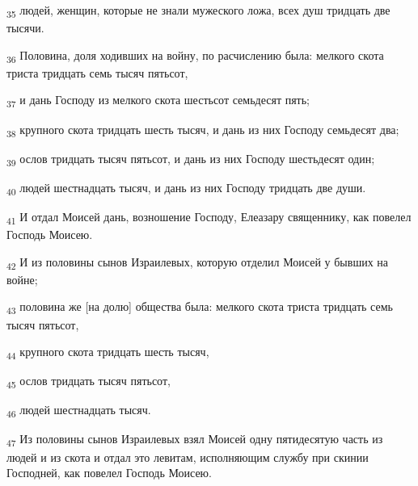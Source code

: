 \begin{tcolorbox}
\textsubscript{35} людей, женщин, которые не знали мужеского ложа, всех душ тридцать две тысячи.
\end{tcolorbox}
\begin{tcolorbox}
\textsubscript{36} Половина, доля ходивших на войну, по расчислению была: мелкого скота триста тридцать семь тысяч пятьсот,
\end{tcolorbox}
\begin{tcolorbox}
\textsubscript{37} и дань Господу из мелкого скота шестьсот семьдесят пять;
\end{tcolorbox}
\begin{tcolorbox}
\textsubscript{38} крупного скота тридцать шесть тысяч, и дань из них Господу семьдесят два;
\end{tcolorbox}
\begin{tcolorbox}
\textsubscript{39} ослов тридцать тысяч пятьсот, и дань из них Господу шестьдесят один;
\end{tcolorbox}
\begin{tcolorbox}
\textsubscript{40} людей шестнадцать тысяч, и дань из них Господу тридцать две души.
\end{tcolorbox}
\begin{tcolorbox}
\textsubscript{41} И отдал Моисей дань, возношение Господу, Елеазару священнику, как повелел Господь Моисею.
\end{tcolorbox}
\begin{tcolorbox}
\textsubscript{42} И из половины сынов Израилевых, которую отделил Моисей у бывших на войне;
\end{tcolorbox}
\begin{tcolorbox}
\textsubscript{43} половина же [на долю] общества была: мелкого скота триста тридцать семь тысяч пятьсот,
\end{tcolorbox}
\begin{tcolorbox}
\textsubscript{44} крупного скота тридцать шесть тысяч,
\end{tcolorbox}
\begin{tcolorbox}
\textsubscript{45} ослов тридцать тысяч пятьсот,
\end{tcolorbox}
\begin{tcolorbox}
\textsubscript{46} людей шестнадцать тысяч.
\end{tcolorbox}
\begin{tcolorbox}
\textsubscript{47} Из половины сынов Израилевых взял Моисей одну пятидесятую часть из людей и из скота и отдал это левитам, исполняющим службу при скинии Господней, как повелел Господь Моисею.
\end{tcolorbox}
